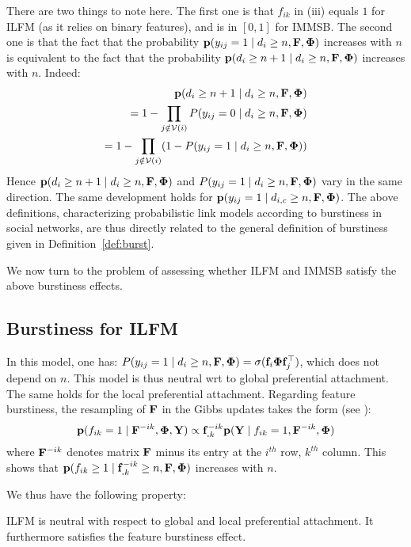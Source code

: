 %
There are two things to note here. The first one is that $f_{ik}$ in (iii) equals $1$ for ILFM (as it relies on binary features), and is in $[0,1]$ for IMMSB. The second one is that the fact that the probability $\mathbf{p}(y_{ij}=1 \mid d_i \ge n, \mathbf{F}, \mathbf{\Phi})$ increases with $n$ is equivalent to the fact that the probability $\mathbf{p}(d_{i} \ge n+1 \mid d_i \ge n, \mathbf{F}, \mathbf{\Phi})$ increases with $n$. Indeed:
%
\begin{align}
\mathbf{p}(d_{i} \ge n+1 \mid d_i \ge n, \mathbf{F}, \mathbf{\Phi}) \nonumber \\
= 1 - \prod_{j \notin \mathcal{V}(i)} P(y_{ij} = 0 \mid d_i \ge n, \mathbf{F}, \mathbf{\Phi}) \nonumber \\
= 1 - \prod_{j \notin \mathcal{V}(i)} (1 - P(y_{ij} = 1 \mid d_i \ge n, \mathbf{F}, \mathbf{\Phi})) \nonumber
\end{align}
%
Hence $\mathbf{p}(d_{i} \ge n+1 \mid d_i \ge n, \mathbf{F}, \mathbf{\Phi})$ and $P(y_{ij} = 1 \mid d_i \ge n, \mathbf{F}, \mathbf{\Phi})$ vary in the same direction. The same development holds for $\mathbf{p}(y_{ij}=1 \mid d_{i,c} \ge n, \mathbf{F}, \mathbf{\Phi})$. The above definitions, characterizing probabilistic link models according to burstiness in social networks, are thus directly related to the general definition of burstiness given in Definition~\ref{def:burst}.

We now turn to the problem of assessing whether ILFM and IMMSB satisfy the above burstiness effects.

\subsection{Burstiness for ILFM}

In this model, one has: $P(y_{ij} = 1 \mid d_i \ge n, \mathbf{F}, \mathbf{\Phi}) = \sigma(\mathbf{f}_i \mathbf{\Phi} \mathbf{f}_j^\top)$, which does not depend on $n$. This model is thus neutral wrt to global preferential attachment. The same holds for the local preferential attachment. Regarding feature burstiness, the resampling of $\mathbf{F}$ in the Gibbs updates takes the form (see \cite{ILFRM}):
%
\[
\mathbf{p}(f_{ik} = 1 \mid \mathbf{F}^{-ik},\mathbf{\Phi}, \mathbf{Y}) \propto \mathbf{f}_{\bm{.}k}^{-ik} \mathbf{p}(\mathbf{Y} \mid f_{ik} = 1,\mathbf{F}^{-ik},\mathbf{\Phi})
\]
%
where $\mathbf{F}^{-ik}$ denotes matrix $\mathbf{F}$ minus its entry at the $i^{th}$ row, $k^{th}$ column. This shows that $\mathbf{p}(f_{ik} \ge 1 \mid \mathbf{f}_{\bm{.}k}^{-ik} \ge n, \mathbf{F}, \mathbf{\Phi})$ increases with $n$.

We thus have the following property:
%
\begin{proposition}
ILFM is neutral with respect to global and local preferential attachment. It furthermore satisfies the feature burstiness effect.
\end{proposition}

